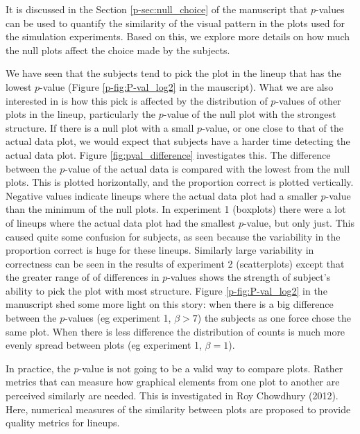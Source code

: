 \documentclass[12pt]{article}
\begin{document}
It is discussed in the Section \ref{p-sec:null_choice} of the manuscript that $p$-values can be used to quantify the similarity of the visual pattern in the plots used for the simulation experiments. Based on this, we explore more details on how much the null plots affect the choice made by the subjects. 

We have seen that the subjects tend to pick the plot in the lineup that has the lowest $p$-value (Figure \ref{p-fig:P-val_log2} in the mauscript). What we are also interested in  is how this pick is affected by the distribution  of $p$-values of other plots in the lineup, particularly the $p$-value of the null plot with the strongest structure. If there is a null plot with a small $p$-value, or one close to that of the actual data plot, we would expect that subjects have a harder time detecting the actual data plot. Figure \ref{fig:pval_difference} investigates this. The difference between the $p$-value of the actual data is compared with the lowest from the null plots. This is plotted horizontally, and the proportion correct is plotted vertically. Negative values indicate lineups where the actual data plot had a smaller $p$-value than the minimum of the null plots. In experiment 1 (boxplots) there were a lot of lineups where the actual data plot had the smallest $p$-value, but only just. This caused quite some confusion for subjects, as seen because the variability in the proportion correct is huge for these lineups. Similarly large variability in correctness can be seen in the results of experiment 2 (scatterplots) except that the greater range of of differences in $p$-values shows the strength of subject's ability to pick the plot with most structure. Figure \ref{p-fig:P-val_log2} in the manuscript shed some more light on this story: when there is a big difference between the $p$-values (eg experiment 1, $\beta>7$) the subjects as one force chose the same plot. When there is less difference the distribution of counts is much more evenly spread between plots (eg experiment 1, $\beta=1$). 

In practice, the $p$-value is not going to be a valid way to compare plots. Rather metrics that can measure how graphical elements from one plot to another are perceived similarly are needed. This is investigated in Roy Chowdhury (2012). Here, numerical measures of the similarity between plots are proposed to provide quality metrics for lineups.
\end{document}
